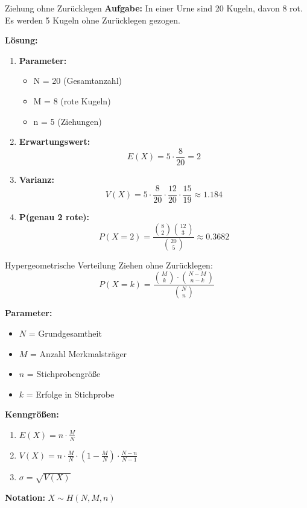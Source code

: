 \begin{example2}{Ziehung ohne Zurücklegen}
\textbf{Aufgabe:} In einer Urne sind 20 Kugeln, davon 8 rot. Es werden 5 Kugeln ohne Zurücklegen gezogen. 

\textbf{Lösung:}
\begin{enumerate}
\item \textbf{Parameter:}
   \begin{itemize}
   \item N = 20 (Gesamtanzahl)
   \item M = 8 (rote Kugeln)
   \item n = 5 (Ziehungen)
   \end{itemize}

\item \textbf{Erwartungswert:}
   $$E(X) = 5 \cdot \frac{8}{20} = 2$$

\item \textbf{Varianz:}
   $$V(X) = 5 \cdot \frac{8}{20} \cdot \frac{12}{20} \cdot \frac{15}{19} \approx 1.184$$

\item \textbf{P(genau 2 rote):}
   $$P(X=2) = \frac{\binom{8}{2}\binom{12}{3}}{\binom{20}{5}} \approx 0.3682$$
\end{enumerate}
\end{example2}

\begin{definition}{Hypergeometrische Verteilung}
Ziehen ohne Zurücklegen:
$$P(X=k)=\frac{\binom{M}{k} \cdot \binom{N-M}{n-k}}{\binom{N}{n}}$$

\textbf{Parameter:}
\begin{itemize}
    \item $N$ = Grundgesamtheit
    \item $M$ = Anzahl Merkmalsträger
    \item $n$ = Stichprobengröße
    \item $k$ = Erfolge in Stichprobe
\end{itemize}

\textbf{Kenngrößen:}
\begin{enumerate}
    \item $E(X) = n \cdot \frac{M}{N}$
    \item $V(X) = n \cdot \frac{M}{N} \cdot (1-\frac{M}{N}) \cdot \frac{N-n}{N-1}$
    \item $\sigma = \sqrt{V(X)}$
\end{enumerate}

\textbf{Notation:} $X \sim H(N,M,n)$
\end{definition}

